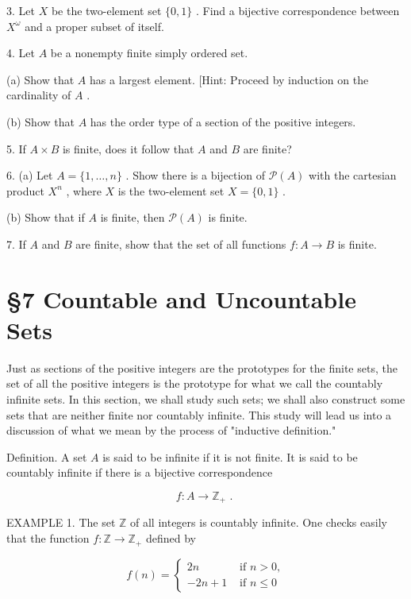 3. Let \(X\) be the two-element set \(\{ 0,1\}\) . Find a bijective correspondence between \({X}^{\omega }\) and a proper subset of itself.

4. Let \(A\) be a nonempty finite simply ordered set.

(a) Show that \(A\) has a largest element. [Hint: Proceed by induction on the cardinality of \(A\) .

(b) Show that \(A\) has the order type of a section of the positive integers.

5. If \(A \times  B\) is finite, does it follow that \(A\) and \(B\) are finite?

6. (a) Let \(A = \{ 1,\ldots ,n\}\) . Show there is a bijection of \(\mathcal{P}\left( A\right)\) with the cartesian product \({X}^{n}\) , where \(X\) is the two-element set \(X = \{ 0,1\}\) .

(b) Show that if \(A\) is finite, then \(\mathcal{P}\left( A\right)\) is finite.

7. If \(A\) and \(B\) are finite, show that the set of all functions \(f : A \rightarrow  B\) is finite.

\section*{§7 Countable and Uncountable Sets}

Just as sections of the positive integers are the prototypes for the finite sets, the set of all the positive integers is the prototype for what we call the countably infinite sets. In this section, we shall study such sets; we shall also construct some sets that are neither finite nor countably infinite. This study will lead us into a discussion of what we mean by the process of "inductive definition."

Definition. A set \(A\) is said to be infinite if it is not finite. It is said to be countably infinite if there is a bijective correspondence

\[
f : A \rightarrow  {\mathbb{Z}}_{ + }\text{ . }
\]

EXAMPLE 1. The set \(\mathbb{Z}\) of all integers is countably infinite. One checks easily that the function \(f : \mathbb{Z} \rightarrow  {\mathbb{Z}}_{ + }\) defined by

\[
f\left( n\right)  = \left\{  \begin{array}{ll} {2n} & \text{ if }n > 0, \\   - {2n} + 1 & \text{ if }n \leq  0 \end{array}\right.
\]

